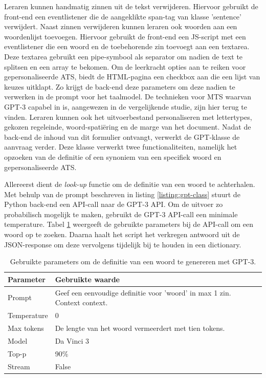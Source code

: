 Leraren kunnen handmatig zinnen uit de tekst verwijderen. Hiervoor gebruikt de front-end een eventlistener die de aangeklikte span-tag van klasse 'sentence' verwijdert. Naast zinnen verwijderen kunnen leraren ook woorden aan een woordenlijst toevoegen. Hiervoor gebruikt de front-end een JS-script met een eventlistener die een woord en de toebehorende zin toevoegt aan een textarea. Deze textarea gebruikt een pipe-symbool als separator om nadien de text te splitsen en een array te bekomen. Om de leerkracht opties aan te reiken voor gepersonaliseerde ATS, biedt de HTML-pagina een checkbox aan die een lijst van keuzes uitklapt. Zo krijgt de back-end deze parameters om deze nadien te verwerken in de prompt voor het taalmodel. De technieken voor MTS waarvan GPT-3 capabel in is, aangewezen in de vergelijkende studie, zijn hier terug te vinden. Leraren kunnen ook het uitvoerbestand personaliseren met lettertypes, gekozen regeleinde, woord-spatiëring en de marge van het document. Nadat de back-end de inhoud van dit formulier ontvangt, verwerkt de GPT-klasse de aanvraag verder. Deze klasse verwerkt twee functionaliteiten, namelijk het opzoeken van de definitie of een synoniem van een specifiek woord en gepersonaliseerde ATS.

\medspace

Allereerst dient de \textit{look-up} functie om de definitie van een woord te achterhalen. Met behulp van de prompt beschreven in listing \ref{listing:gpt-class} stuurt de Python back-end een API-call naar de GPT-3 API. Om de uitvoer zo probabilisch mogelijk te maken, gebruikt de GPT-3 API-call een minimale temperature. Tabel \ref{table:gpt-3-look-up} weergeeft de gebruikte parameters bij de API-call om een woord op te zoeken. Daarna haalt het script het verkregen antwoord uit de JSON-response om deze vervolgens tijdelijk bij te houden in een dictionary.

\begin{center}
	\begin{table}
		\begin{tabular}{| m{5cm}| m{8cm} |}
			\hline
			Parameter & Gebruikte waarde \\ \hline
			Prompt & Geef een eenvoudige definitie voor '{woord}' in max 1 zin. Context {context}. \\ \hline
			Temperature & 0 \\ \hline
			Max tokens & De lengte van het woord vermeerdert met tien tokens. \\ \hline
			Model & Da Vinci 3 \\ \hline
			Top-p & 90\% \\ \hline
			Stream & False \\ \hline
		\end{tabular}
	\caption{Gebruikte parameters om de definitie van een woord te genereren met GPT-3.}
	\label{table:gpt-3-look-up}
	\end{table}
\end{center}

